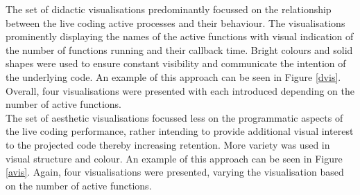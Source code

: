 \documentclass{article}
\begin{document}
The set of didactic visualisations predominantly focussed on the relationship between the live coding active processes and their behaviour. The visualisations prominently displaying the names of the active functions with visual indication of the number of functions running and their callback time. Bright colours and solid shapes were used to ensure constant visibility and communicate the intention of the underlying code. An example of this approach can be seen in Figure \ref{dvis}. Overall, four visualisations were presented with each introduced depending on the number of active functions.\\

The set of aesthetic visualisations focussed less on the programmatic aspects of the live coding performance, rather intending to provide additional visual interest to the projected code thereby increasing retention. More variety was used in visual structure and colour. An example of this approach can be seen in Figure \ref{avis}. Again, four visualisations were presented, varying the visualisation based on the number of active functions.\\
\end{document}
